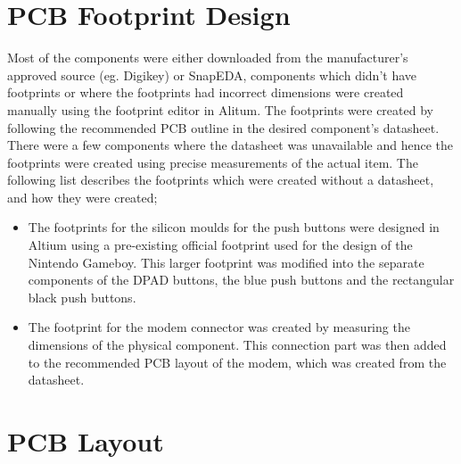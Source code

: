 
\section{PCB Footprint Design}
\label{chap6sec4}

	Most of the components were either downloaded from the manufacturer's approved source (eg. Digikey) or SnapEDA, components which didn't have footprints or where the footprints had incorrect dimensions were created manually using the footprint editor in Alitum. The footprints were created by following the recommended PCB outline in the desired component's datasheet. There were a few components where the datasheet was unavailable and hence the footprints were created using precise measurements of the actual item. The following list describes the footprints which were created without a datasheet, and how they were created;

\begin{itemize}
\item The footprints for the silicon moulds for the push buttons were designed in Altium using a pre-existing official footprint used for the design of the Nintendo Gameboy. This larger footprint was modified into the separate components of the DPAD buttons, the blue push buttons and the rectangular black push buttons.
\item The footprint for the modem connector was created by measuring the dimensions of the physical component. This connection part was then added to the recommended PCB layout of the modem, which was created from the datasheet. 
\end{itemize}


\section{PCB Layout}
\label{chap6sec5}

